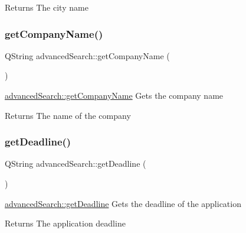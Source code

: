 \begin{DoxyReturn}{Returns}
The city name 
\end{DoxyReturn}
\mbox{\label{classadvanced_search_a5e9e9e24e83f36f9ed32bd60cecbb7de}} 
\subsubsection{\texorpdfstring{getCompanyName()}{getCompanyName()}}
{\footnotesize\ttfamily Q\+String advanced\+Search\+::get\+Company\+Name (\begin{DoxyParamCaption}{ }\end{DoxyParamCaption})}



\mbox{\hyperlink{classadvanced_search_a5e9e9e24e83f36f9ed32bd60cecbb7de}{advanced\+Search\+::get\+Company\+Name}} Gets the company name 

\begin{DoxyReturn}{Returns}
The name of the company 
\end{DoxyReturn}
\mbox{\label{classadvanced_search_ae58a90dea341fa431df72e368b70267e}} 
\subsubsection{\texorpdfstring{getDeadline()}{getDeadline()}}
{\footnotesize\ttfamily Q\+String advanced\+Search\+::get\+Deadline (\begin{DoxyParamCaption}{ }\end{DoxyParamCaption})}



\mbox{\hyperlink{classadvanced_search_ae58a90dea341fa431df72e368b70267e}{advanced\+Search\+::get\+Deadline}} Gets the deadline of the application 

\begin{DoxyReturn}{Returns}
The application deadline 
\end{DoxyReturn}
\mbox{\label{classadvanced_search_a7bcbaf1e2663396daacf9b033c34238a}} 
